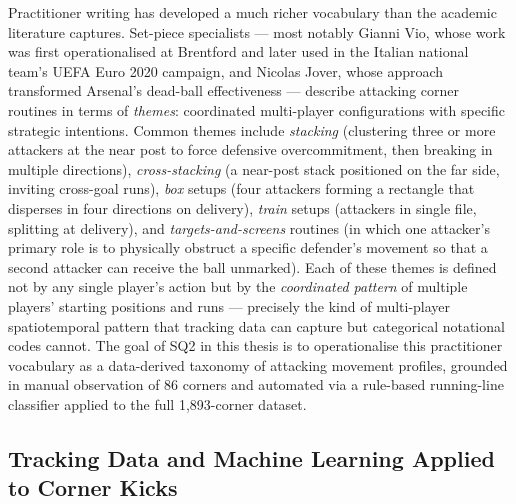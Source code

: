 Practitioner writing has developed a much richer vocabulary than the academic
literature captures. Set-piece specialists --- most notably Gianni Vio, whose
work was first operationalised at Brentford and later used in the Italian
national team's UEFA Euro 2020 campaign, and Nicolas Jover, whose approach
transformed Arsenal's dead-ball effectiveness --- describe attacking corner
routines in terms of \emph{themes}: coordinated multi-player configurations
with specific strategic intentions. Common themes include \emph{stacking}
(clustering three or more attackers at the near post to force defensive
overcommitment, then breaking in multiple directions), \emph{cross-stacking}
(a near-post stack positioned on the far side, inviting cross-goal runs),
\emph{box} setups (four attackers forming a rectangle that disperses in four
directions on delivery), \emph{train} setups (attackers in single file, splitting
at delivery), and \emph{targets-and-screens} routines (in which one attacker's
primary role is to physically obstruct a specific defender's movement so that a
second attacker can receive the ball unmarked). Each of these themes is defined
not by any single player's action but by the \emph{coordinated pattern} of
multiple players' starting positions and runs --- precisely the kind of
multi-player spatiotemporal pattern that tracking data can capture but
categorical notational codes cannot. The goal of SQ2 in this thesis is to
operationalise this practitioner vocabulary as a data-derived taxonomy of
attacking movement profiles, grounded in manual observation of 86 corners and
automated via a rule-based running-line classifier applied to the full
1{,}893-corner dataset.

\subsection{Tracking Data and Machine Learning Applied to Corner Kicks}
\label{sec:lit_tracking}

